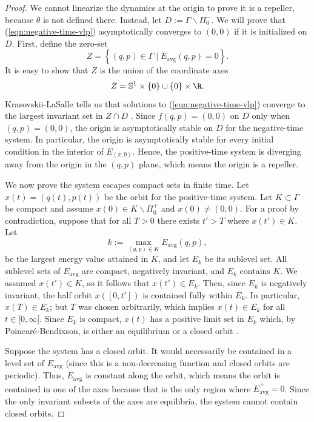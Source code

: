 \begin{proof}
   We cannot linearize the dynamics at the origin to prove it is a repeller,
   because \(\theta\) is not defined there.
   Instead, let \(D := \Gamma \backslash \Pi_0^-\).
   We will prove that (\ref{eqn:negative-time-vlp}) asymptotically converges to
   \((0,0)\) if it is initialized on \(D\).
   First, define the zero-set
   \[
      Z = \left\{(q,p) \in \Gamma \mid 
      \dot{E}_\text{avg}(q,p) = 0 \right\}
      .
   \]
   It is easy to show that \(Z\) is the union of the coordinate axes
   \[
      Z= \mathbb{S}^1 \times \left\{0\right\} \cup 
         \left\{0\right\} \times \R
      .
   \]
   Krasovskii-LaSalle tells us that solutions to (\ref{eqn:negative-time-vlp})
   converge to the largest invariant set in \(Z \cap D\)
   \cite{krasovskii_lasalle}.
   Since \(f(q,p) = (0,0)\) on \(D\) only when \((q,p) = (0,0)\),
   the origin is asymptotically stable on \(D\) for the negative-time system.
   In particular, the origin is asymptotically stable for every initial
   condition in the interior of \(E_{(\pi,0)}\).
   Hence, the positive-time system is diverging away from the origin 
   in the \((q,p)\) plane, which means the origin is a repeller.

   We now prove the system escapes compact sets in finite time.
   Let \(x(t) = (q(t),p(t))\) be the orbit for the positive-time system.
   Let \(K \subset \Gamma\) be compact and assume 
   \(x(0) \in K\backslash \Pi_0^+\) and \(x(0) \neq (0,0)\).
   For a proof by contradiction, suppose that for all \(T > 0\) there exists
   \(t' > T\) where \(x(t') \in K\).
   Let 
   \[
      k := \max\limits_{(q,p) \in K} E_\text{avg}(q,p)
      ,
   \] 
   be the largest energy value attained in \(K\), and let \(E_k\) be its
   sublevel set.
   All sublevel sets of \(E_\text{avg}\) are compact, negatively
   invariant, and \(E_k\) contains \(K\).
   We assumed \(x(t') \in K\), so it follows that \(x(t') \in E_k\). 
   Then, since \(E_k\) is negatively invariant, the half orbit
   \(x([0,t'])\) is contained fully within \(E_k\).
   In particular, \(x(T) \in E_k\);
   but \(T\) was chosen arbitrarily, which implies \(x(t) \in E_k\) for all
   \(t \in [0,\infty[\).
   Since \(E_k\) is compact, \(x(t)\) has a positive limit set in
   \(E_k\) which, by Poincar\'{e}-Bendixson, is either an equilibrium or a
   closed orbit \cite{poincare_bendixson}.

   Suppose the system has a closed orbit. It would necessarily be contained in a
   level set of \(E_\text{avg}\) (since this is a non-decreasing function and
   closed orbits are periodic).
   Thus, \(E_\text{avg}\) is constant along the orbit, which means the
   orbit is contained in one of the axes because that is the only region where
   \(\dot{E}_\text{avg}^+ = 0\).
   Since the only invariant subsets of the axes are equilibria, the system cannot
   contain closed orbits.


\end{proof}
